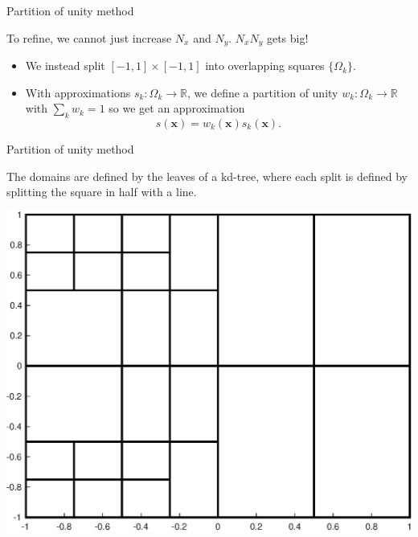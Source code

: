 \documentclass{beamer}
\newcommand{\R}{\mathbb{R}}
\newcommand{\vect}[1]{\mathbf{#1}}
\begin{document}
\begin{frame}{Partition of unity method}
\begin{center}
To refine, we cannot just increase $N_x$ and $N_y$. $N_x N_y$ gets big!
\end{center}

\begin{itemize}
\item We instead split $[-1,1] \times [-1,1]$ into overlapping squares $\{ \Omega_k \}$.
\item With approximations $s_k:\Omega_k \to \R$, we define a partition of unity $w_k:\Omega_k \to \R$ with $\sum_k w_k=1$ so we get an approximation $$s(\vect{x}) = w_k(\vect{x})s_k(\vect{x}).$$
\end{itemize}

\end{frame}

\begin{frame}{Partition of unity method}
\begin{center}
The domains are defined by the leaves of a kd-tree, where each split is defined by splitting the square in half with a line.
\end{center}

\begin{center}
\includegraphics[scale = 0.4]{zonePlot.eps}
\end{center}
\end{frame}
\end{document}
